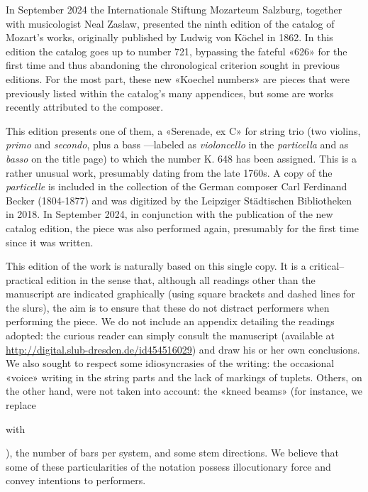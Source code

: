 In September 2024 the Internationale Stiftung Mozarteum Salzburg, together with musicologist Neal Zaslaw, presented the ninth edition of the catalog of Mozart's works, originally published by Ludwig von Köchel in 1862. In this edition the catalog goes up to number 721, bypassing the fateful «626» for the first time and thus abandoning the chronological criterion sought in previous editions. For the most part, these new «Koechel numbers» are pieces that were previously listed within the catalog's many appendices, but some are works recently attributed to the composer. 

This edition presents one of them, a «Serenade, ex C» for string trio (two violins, \emph{primo} and \emph{secondo}, plus a bass ---labeled as \emph{violoncello} in the \emph{particella} and as \emph{basso} on the title page) to which the number K. 648 has been assigned. This is a rather unusual work, presumably dating from the late 1760s. A copy of the \emph{particelle} is included in the collection of the German composer Carl Ferdinand Becker (1804-1877) and was digitized by the Leipziger Städtischen Bibliotheken in 2018. In September 2024, in conjunction with the publication of the new catalog edition, the piece was also performed again, presumably for the first time since it was written. 

This edition of the work is naturally based on this single copy. It is a critical--practical edition in the sense that, although all readings other than the manuscript are indicated graphically (using square brackets and dashed lines for the slurs), the aim is to ensure that these do not distract performers when performing the piece. We do not include an appendix detailing the readings adopted: the curious reader can simply consult the manuscript (available at \href{http://digital.slub-dresden.de/id454516029}{http://digital.slub-dresden.de/id454516029}) and draw his or her own conclusions. We also sought to respect some idiosyncrasies of the writing: the occasional «voice» writing in the string parts and the lack of markings of tuplets. Others, on the other hand, were not taken into account: the «kneed beams» (for instance, we replace 
    with 
), the number of bars per system, and some stem directions. We believe that some of these particularities of the notation possess illocutionary force and convey intentions to performers. 

